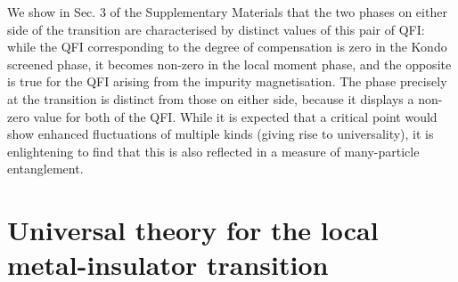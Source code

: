 \documentclass{iopart}
\begin{document}
We show in Sec. 3 of the Supplementary Materials that the two phases on either side of the transition are characterised by distinct values of this pair of QFI: while the QFI corresponding to the degree of compensation is zero in the Kondo screened phase, it becomes non-zero in the local moment phase, and the opposite is true for the QFI arising from the impurity magnetisation.
The phase precisely at the transition is distinct from those on either side, because it displays a non-zero value for both of the QFI.
While it is expected that a critical point would show enhanced fluctuations of multiple kinds (giving rise to universality), it is enlightening to find that this is also reflected in a measure of many-particle entanglement.

\section{Universal theory for the local metal-insulator transition}\label{insights}
\end{document}
